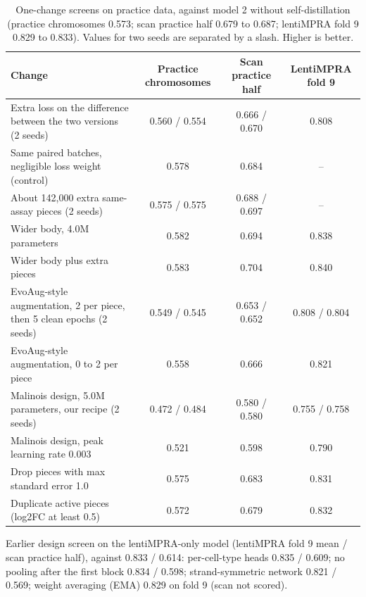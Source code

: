 \documentclass[11pt]{article}
\begin{document}
\begin{table}[h]
\centering
\caption{One-change screens on practice data, against model 2 without self-distillation (practice chromosomes 0.573; scan practice half 0.679 to 0.687; lentiMPRA fold 9 0.829 to 0.833). Values for two seeds are separated by a slash. Higher is better.}
\label{tab:screen}
\footnotesize
\begin{tabular}{p{6.4cm}ccc}
\toprule
Change & Practice chromosomes & Scan practice half & LentiMPRA fold 9 \\
\midrule
Extra loss on the difference between the two versions (2 seeds) & 0.560 / 0.554 & 0.666 / 0.670 & 0.808 \\
Same paired batches, negligible loss weight (control) & 0.578 & 0.684 & -- \\
About 142,000 extra same-assay pieces (2 seeds) & 0.575 / 0.575 & 0.688 / 0.697 & -- \\
Wider body, 4.0M parameters & 0.582 & 0.694 & 0.838 \\
Wider body plus extra pieces & 0.583 & 0.704 & 0.840 \\
EvoAug-style augmentation, 2 per piece, then 5 clean epochs (2 seeds) & 0.549 / 0.545 & 0.653 / 0.652 & 0.808 / 0.804 \\
EvoAug-style augmentation, 0 to 2 per piece & 0.558 & 0.666 & 0.821 \\
Malinois design, 5.0M parameters, our recipe (2 seeds) & 0.472 / 0.484 & 0.580 / 0.580 & 0.755 / 0.758 \\
Malinois design, peak learning rate 0.003 & 0.521 & 0.598 & 0.790 \\
Drop pieces with max standard error 1.0 & 0.575 & 0.683 & 0.831 \\
Duplicate active pieces (log2FC at least 0.5) & 0.572 & 0.679 & 0.832 \\
\bottomrule
\end{tabular}
\end{table}

Earlier design screen on the lentiMPRA-only model (lentiMPRA fold 9 mean / scan practice half), against 0.833 / 0.614: per-cell-type heads 0.835 / 0.609; no pooling after the first block 0.834 / 0.598; strand-symmetric network 0.821 / 0.569; weight averaging (EMA) 0.829 on fold 9 (scan not scored).
\end{document}
